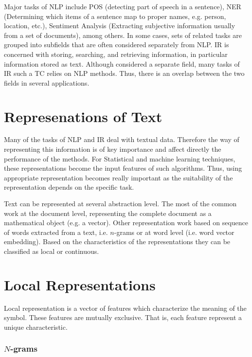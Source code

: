 Major tasks of \ac{NLP} include  \ac{POS} (detecting part of speech in a
sentence), \ac{NER}  (Determining which items of a sentence map to proper
names, e.g. person, location, etc.),   Sentiment Analysis (Extracting
subjective information usually from a set of documents), among others. 
In some cases, sets of related tasks are grouped into subfields that are often
considered separately from \ac{NLP}. \ac{IR} is concerned with storing,
searching, and retrieving information, in particular  information stored as
text. Although considered a separate field, many tasks of \ac{IR} such a
\ac{TC} relies on \ac{NLP} methods. Thus, there is an overlap between the two
fields in several applications.



\section{Represenations of Text}
 \label{sec:rel_represenation_text}
  Many of the tasks of \ac{NLP} and \ac{IR} deal with textual data. Therefore
  the way  of representing this information is of key importance and affect
  directly the performance of the methods.  For  Statistical and machine
  learning techniques, these representations become the input features of
  such algorithms. Thus, using appropriate representation  becomes really
  important as the suitability of the representation  depends on the specific
  task.
  
  Text can be represented at several abstraction level.  The most of the
  common work at the document level, representing the complete document as a
  mathematical object (e.g. a vector). Other representation work based on
  sequence of words extracted from a text, i.e. $n$-grams or at word level
  (i.e. word vector embedding). Based on the characteristics of the
  representations they can be classified as local or continuous. 
 
  

\section{Local Representations}
 \label{sec:rel_local_representation}
 Local representation is a vector of features which characterize the
 meaning of the symbol. These  features  are mutually exclusive. That is, each feature
 represent a unique characteristic.
 
 \subsubsection{$N$-grams}
 \label{sec:sub_ngrams}

